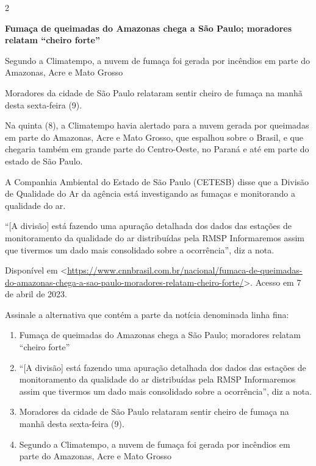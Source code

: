 {{\begin{itemize}
\begin{itemize}
\num{2}

\textbf{Fumaça de queimadas do Amazonas chega a São Paulo; moradores
relatam ``cheiro forte''}

Segundo a Climatempo, a nuvem de fumaça foi gerada por incêndios em
parte do Amazonas, Acre e Mato Grosso

Moradores da cidade de São Paulo relataram sentir cheiro de fumaça na
manhã desta sexta-feira (9).

Na quinta (8), a Climatempo havia alertado para a nuvem gerada por
queimadas em parte do Amazonas, Acre e Mato Grosso, que espalhou sobre o
Brasil, e que chegaria também em grande parte do Centro-Oeste, no Paraná
e até em parte do estado de São Paulo.

A Companhia Ambiental do Estado de São Paulo (CETESB) disse que a
Divisão de Qualidade do Ar da agência está investigando as fumaças e
monitorando a qualidade do ar.

``{[}A divisão{]} está fazendo uma apuração detalhada dos dados das
estações de monitoramento da qualidade do ar distribuídas pela RMSP
Informaremos assim que tivermos um dado mais consolidado sobre a
ocorrência'', diz a nota.

Disponível em
\textless{}\href{https://www.cnnbrasil.com.br/nacional/fumaca-de-queimadas-do-amazonas-chega-a-sao-paulo-moradores-relatam-cheiro-forte/}{\uline{https://www.cnnbrasil.com.br/nacional/fumaca-de-queimadas-do-amazonas-chega-a-sao-paulo-moradores-relatam-cheiro-forte/}}\textgreater.
Acesso em 7 de abril de 2023.

Assinale a alternativa que contém a parte da notícia denominada linha
fina:

\begin{enumerate}
\def\labelenumi{\alph{enumi})}
\item
  Fumaça de queimadas do Amazonas chega a São Paulo; moradores relatam
  ``cheiro forte''
\item
  ``{[}A divisão{]} está fazendo uma apuração detalhada dos dados das
  estações de monitoramento da qualidade do ar distribuídas pela RMSP
  Informaremos assim que tivermos um dado mais consolidado sobre a
  ocorrência'', diz a nota.
\item
  Moradores da cidade de São Paulo relataram sentir cheiro de fumaça na
  manhã desta sexta-feira (9).
\item
  Segundo a Climatempo, a nuvem de fumaça foi gerada por incêndios em
  parte do Amazonas, Acre e Mato Grosso
\end{enumerate}


\end{itemize}
\end{itemize}}}
